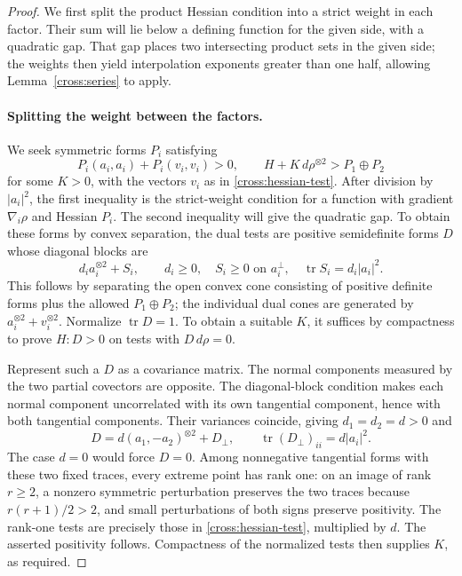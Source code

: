 \begin{proof}
We first split the product Hessian condition into a strict weight in
each factor. Their sum will lie below a defining function for the given
side, with a quadratic gap. That gap places two intersecting product
sets in the given side; the weights then yield interpolation exponents
greater than one half, allowing Lemma~\ref{cross:series} to apply.

\paragraph{Splitting the weight between the factors.}
We seek symmetric forms $P_i$ satisfying
\[
 P_i(a_i,a_i)+P_i(v_i,v_i)>0,
 \qquad H+K\,d\rho^{\otimes2}>P_1\oplus P_2
\]
for some $K>0$, with the vectors $v_i$ as in
\eqref{cross:hessian-test}. After division by $|a_i|^2$, the first
inequality is the strict-weight condition for a function with gradient
$\nabla_i\rho$ and Hessian $P_i$. The second inequality will give the
quadratic gap. To obtain these forms by convex separation, the dual
tests are positive semidefinite forms $D$ whose diagonal blocks are
\[
 d_i a_i^{\otimes2}+S_i,\qquad
 d_i\ge0,\quad S_i\ge0\text{ on }a_i^\perp,
 \quad \operatorname{tr} S_i=d_i|a_i|^2.
\]
This follows by separating the open convex cone consisting of positive
definite forms plus the allowed $P_1\oplus P_2$; the individual dual
cones are generated by $a_i^{\otimes2}+v_i^{\otimes2}$.
Normalize $\operatorname{tr} D=1$.  To obtain a suitable $K$, it suffices by
compactness to prove $H:D>0$ on tests with $D\,d\rho=0$.

Represent such a $D$ as a covariance matrix.  The normal components
measured by the two partial covectors are opposite.  The diagonal-block
condition makes each normal component uncorrelated with its own
tangential component, hence with both tangential components.
Their variances coincide, giving $d_1=d_2=d>0$ and
\[
 D=d(a_1,-a_2)^{\otimes2}+D_\perp,
 \qquad \operatorname{tr}(D_\perp)_{ii}=d|a_i|^2.
\]
The case $d=0$ would force $D=0$.  Among nonnegative tangential forms
with these two fixed traces, every extreme point has rank one:
on an image of rank $r\ge2$, a nonzero symmetric perturbation preserves
the two traces because $r(r+1)/2>2$, and small perturbations of both
signs preserve positivity.  The rank-one tests are precisely those
in \eqref{cross:hessian-test}, multiplied by $d$.
The asserted positivity follows.  Compactness of the normalized tests
then supplies $K$, as required.


\end{proof}

